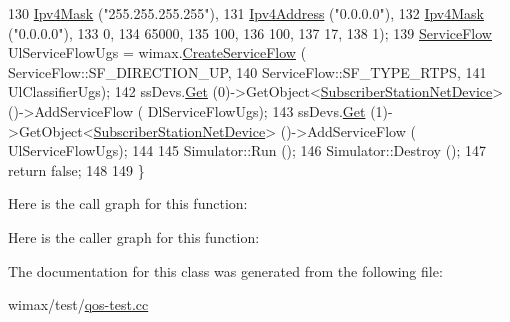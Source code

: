 \begin{DoxyCode}
130                                         \hyperlink{classns3_1_1Ipv4Mask}{Ipv4Mask} (\textcolor{stringliteral}{"255.255.255.255"}),
131                                         \hyperlink{classns3_1_1Ipv4Address}{Ipv4Address} (\textcolor{stringliteral}{"0.0.0.0"}),
132                                         \hyperlink{classns3_1_1Ipv4Mask}{Ipv4Mask} (\textcolor{stringliteral}{"0.0.0.0"}),
133                                         0,
134                                         65000,
135                                         100,
136                                         100,
137                                         17,
138                                         1);
139   \hyperlink{classns3_1_1ServiceFlow}{ServiceFlow} UlServiceFlowUgs = wimax.\hyperlink{classns3_1_1WimaxHelper_aed0c1ffdcd62234c14965f899efc88c1}{CreateServiceFlow} (
      ServiceFlow::SF\_DIRECTION\_UP,
140                                                           ServiceFlow::SF\_TYPE\_RTPS,
141                                                           UlClassifierUgs);
142   ssDevs.\hyperlink{classns3_1_1NetDeviceContainer_a677d62594b5c9d2dea155cc5045f4d0b}{Get} (0)->GetObject<\hyperlink{classns3_1_1SubscriberStationNetDevice}{SubscriberStationNetDevice}> ()->AddServiceFlow (
      DlServiceFlowUgs);
143   ssDevs.\hyperlink{classns3_1_1NetDeviceContainer_a677d62594b5c9d2dea155cc5045f4d0b}{Get} (1)->GetObject<\hyperlink{classns3_1_1SubscriberStationNetDevice}{SubscriberStationNetDevice}> ()->AddServiceFlow (
      UlServiceFlowUgs);
144 
145   Simulator::Run ();
146   Simulator::Destroy ();
147   \textcolor{keywordflow}{return} \textcolor{keyword}{false};
148 
149 \}
\end{DoxyCode}


Here is the call graph for this function\+:




Here is the caller graph for this function\+:




The documentation for this class was generated from the following file\+:\begin{DoxyCompactItemize}
\item 
wimax/test/\hyperlink{qos-test_8cc}{qos-\/test.\+cc}\end{DoxyCompactItemize}
